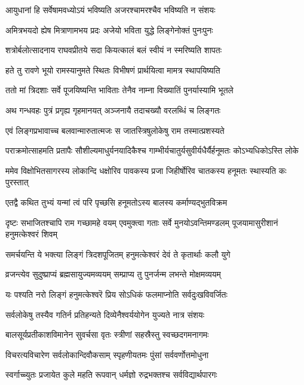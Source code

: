 \twolineshloka
{आयुधानां हि सर्वेषामवध्योऽयं भविष्यति}
{अजरश्चामरश्चैव भविष्यति न संशयः}%

\twolineshloka
{अमित्रभयदो ह्येष मित्राणामभय प्रदः}
{अजेयो भविता युद्धे लिङ्गेनोक्तं पुनःपुनः}%

\twolineshloka
{शत्रोर्बलोत्सादनाय राघवप्रीतये सदा}
{कियत्कालं बलं स्वीयं न स्मरिष्यति शापतः}%

\twolineshloka
{हते तु रावणे भूयो रामस्यानुमते स्थितः}
{विभीषणं प्रार्थयित्वा मामत्र स्थापयिष्यति}%

\twolineshloka
{ततो मां त्रिदशाः सर्वे पूजयिष्यन्ति भाविताः}
{तेनैव नाम्ना विख्यातिं पुनर्यास्यामि भूतले}%

\twolineshloka
{अथ गन्धवहः पुत्रं प्रगृह्य गृहमानयत्}
{अञ्जनायै तदाचख्यौ वरलब्धिं च लिङ्गतः}%

\twolineshloka
{एवं लिङ्गप्रभावाच्च बलवान्मारुतात्मजः}
{स जातस्त्रिषुलोकेषु राम तस्मात्प्रशस्यते}%

\twolineshloka
{पराक्रमोत्साहमति प्रतापैः सौशील्यमाधुर्यनयादिकैश्च}
{गाम्भीर्यचातुर्यसुवीर्यधैर्यैर्हनूमतः कोऽभ्यधिकोऽस्ति लोके}%

\twolineshloka
{ममेव विक्षोभितसागरस्य लोकान्दि धक्षोरिव पावकस्य}
{प्रजा जिहीर्षोरिव चातकस्य हनूमतः स्थास्यति कः पुरस्तात्}%

\twolineshloka
{एतद्वै कथित तुभ्यं यन्मां त्वं परि पृच्छसि}
{हनूमतोऽस्य बालस्य कर्माण्यद्भुतविक्रम}%

\threelineshloka
{दृष्टः सभाजितश्चापि राम गच्छामहे वयम्}
{एवमुक्त्वा गताः सर्वे मुनयोऽवन्तिमण्डलम्}
{पूजयामासुरीशानं हनुमत्केश्वरं शिवम्}

\twolineshloka
{समर्चयन्ति ये भक्त्या लिङ्गं त्रिदशपूजितम्}
{हनुमत्केश्वरं देवं ते कृतार्थाः कलौ युगे}%

\twolineshloka
{व्रजन्त्येव सुदुष्प्राप्यं ब्रह्मसायुज्यमव्ययम्}
{सम्प्राप्य तु पुनर्जन्म लभन्ते मोक्षमव्ययम्}%

\twolineshloka
{यः पश्यति नरो लिङ्गं हनुमत्केश्वरॆ प्रिय}
{सोऽधिकं फलमाप्नोति सर्वदुःखविवर्जितः}%

\twolineshloka
{सर्वलोकेषु तस्यैव गतिर्न प्रतिहन्यते}
{दिव्येनैश्वर्ययोगेन युज्यते नात्र संशयः}%

\twolineshloka
{बालसूर्यप्रतीकाशविमानेन सुवर्चसा}
{वृतः स्त्रीणां सहस्रैस्तु स्वच्छदगमनागमः}%

\twolineshloka
{विचरत्यविचारेण सर्वलोकान्दिवौकसाम्}
{स्पृहणीयतमः पुंसां सर्ववर्णोत्तमोधुना}%

\twolineshloka
{स्वर्गाच्च्युतः प्रजायेत कुले महति रूपवान्}
{धर्मज्ञो रुद्रभक्तश्च सर्वविद्यार्थपारगः}%

